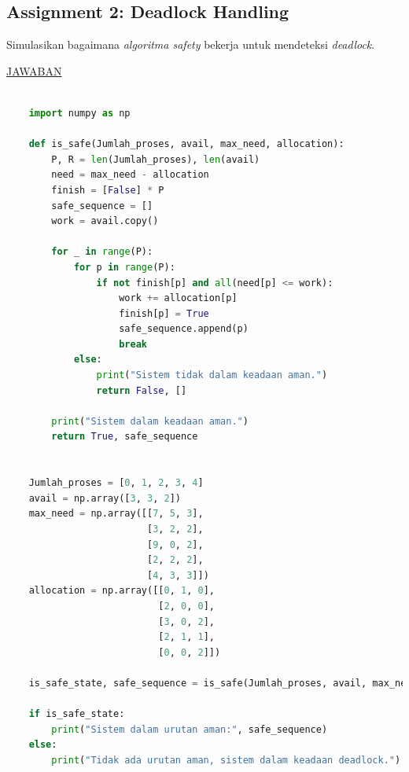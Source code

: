 \documentclass[12pt]{article}
\begin{document}
\subsection{Assignment 2: Deadlock Handling}
\hspace*{1cm} Simulasikan bagaimana \textit{algoritma safety} bekerja untuk mendeteksi \textit{deadlock}.
\newline
\newline

\begin{center}
    \underline{JAWABAN}
\end{center}

\begin{lstlisting}[language=Python]

    import numpy as np
    
    def is_safe(Jumlah_proses, avail, max_need, allocation):
        P, R = len(Jumlah_proses), len(avail) 
        need = max_need - allocation 
        finish = [False] * P 
        safe_sequence = []  
        work = avail.copy() 
    
        for _ in range(P):
            for p in range(P):
                if not finish[p] and all(need[p] <= work): 
                    work += allocation[p]
                    finish[p] = True
                    safe_sequence.append(p)
                    break
            else:
                print("Sistem tidak dalam keadaan aman.")
                return False, []
    
        print("Sistem dalam keadaan aman.")
        return True, safe_sequence
    
    
    Jumlah_proses = [0, 1, 2, 3, 4]
    avail = np.array([3, 3, 2]) 
    max_need = np.array([[7, 5, 3],
                         [3, 2, 2],
                         [9, 0, 2],
                         [2, 2, 2],
                         [4, 3, 3]]) 
    allocation = np.array([[0, 1, 0],
                           [2, 0, 0],
                           [3, 0, 2],
                           [2, 1, 1],
                           [0, 0, 2]]) 
    
    is_safe_state, safe_sequence = is_safe(Jumlah_proses, avail, max_need, allocation)
    
    if is_safe_state:
        print("Sistem dalam urutan aman:", safe_sequence)
    else:
        print("Tidak ada urutan aman, sistem dalam keadaan deadlock.")
    
\end{lstlisting}
\end{document}
